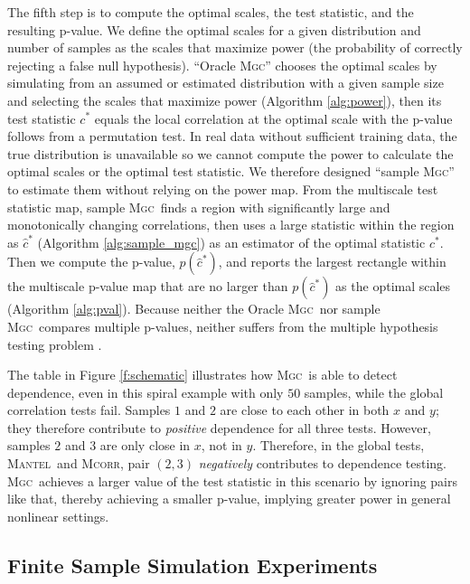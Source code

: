 \documentclass[11pt]{article}
\providecommand{\sct}[1]{{\normalfont\textsc{#1}}}
\newcommand{\G}{c}
\newcommand{\Mgc}{\sct{Mgc}}
\newcommand{\Mcorr}{\sct{Mcorr}}
\newcommand{\Mantel}{\sct{Mantel}}
\begin{document}
The fifth step is to compute the optimal scales, the test statistic, and the resulting p-value.
We define the optimal scales for a given distribution and number of samples as the scales that maximize power (the probability of correctly rejecting a false null hypothesis).  
``Oracle \Mgc'' chooses the optimal scales by simulating from an assumed or estimated distribution with a given sample size and selecting the scales that maximize power  (Algorithm \ref{alg:power}), then its test statistic $\G^*$ equals the local correlation at the optimal scale with the p-value follows from a permutation test. 
In real data without sufficient training data, the true distribution is unavailable so we cannot compute the power to calculate the optimal scales or the optimal test statistic.
We therefore designed  ``sample \Mgc'' to estimate  them without relying on the power map. 
From the multiscale test statistic map, sample \Mgc~finds a region with significantly large and monotonically changing correlations, then uses a large statistic within the region as $\hat{\G}^*$ (Algorithm \ref{alg:sample_mgc}) as an estimator of the optimal statistic $\G^*$. Then we compute the p-value, $p(\hat{\G}^*)$, and reports the largest rectangle within the multiscale p-value map that are no larger than $p(\hat{\G}^*)$ as the optimal scales (Algorithm \ref{alg:pval}). Because neither the Oracle \Mgc~nor sample \Mgc~compares multiple p-values, neither suffers from the multiple hypothesis testing problem \cite{Benjamini1995}.

The table in Figure \ref{f:schematic} illustrates how \Mgc~is able to detect dependence, even in this spiral example with only $50$ samples, while the global correlation tests fail.  Samples $1$ and $2$ are close to each other in both $x$ and $y$; they therefore contribute to \emph{positive} dependence for all three tests.  However, samples $2$ and $3$ are only close in $x$, not in $y$.  Therefore, in the global tests, \Mantel~and \Mcorr, pair $(2,3)$   \emph{negatively} contributes to dependence testing.  \Mgc~achieves a larger value of the test statistic in this scenario by ignoring  pairs like that, thereby achieving a smaller p-value, implying greater power in general nonlinear settings.  


\subsection*{Finite Sample Simulation Experiments}
\end{document}
